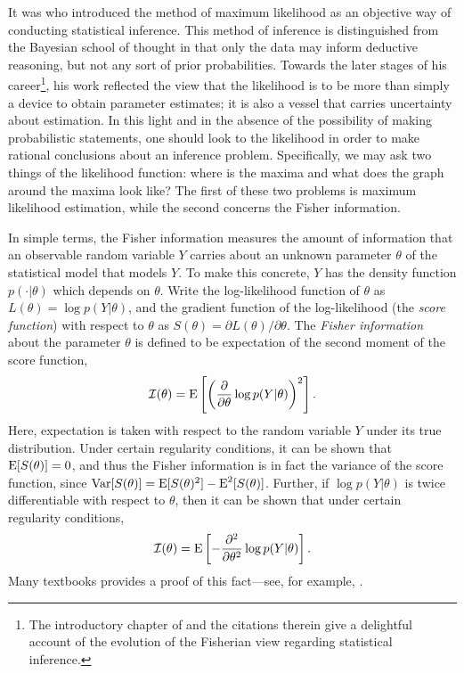 It was \citet{ra1922mathematical} who introduced the method of maximum likelihood as an objective way of conducting statistical inference.
This method of inference is distinguished from the Bayesian school of thought in that only the data may inform deductive reasoning, but not any sort of  prior probabilities.
Towards the later stages of his career\footnote{The introductory chapter of \citet{pawitan2001all} and the citations therein give a delightful  account of the evolution of the Fisherian view regarding statistical inference.}, his work reflected the view that the likelihood is to be more than simply a device to obtain parameter estimates; it is also a vessel that carries uncertainty about estimation.
In this light and in the absence of the possibility of making probabilistic statements, one should look to the likelihood in order to make rational conclusions about an inference problem.
Specifically, we may ask two things of the likelihood function: where is the maxima and what does the graph around the maxima look like?
The first of these two problems is maximum likelihood estimation, while the second concerns the Fisher information.

In simple terms, the Fisher information measures the amount of information that an observable random variable $Y$ carries about an unknown parameter $\theta$ of the statistical model that models $Y$.
To make this concrete, $Y$ has the density function $p(\cdot|\theta)$ which depends on $\theta$.
Write the log-likelihood function of $\theta$ as $L(\theta) = \log p(Y|\theta)$, and the gradient function of the log-likelihood (the \emph{score function}) with respect to $\theta$ as $S(\theta) = \partial L(\theta)/\partial\theta$.
The \emph{Fisher information} about the parameter $\theta$ is defined to be expectation of the second moment of the score function, 
\[
  {\mathcal I}(\theta) = \operatorname{E}\left[\left(\frac{\partial}{\partial\theta} \log p(Y|\theta)\right)^2\right].
\]
Here, expectation is taken with respect to the random variable $Y$ under its true distribution.
Under certain regularity conditions, it can be shown that $\operatorname{E}[S(\theta)] = 0$, and thus the Fisher information is in fact the variance of the score function, since $\operatorname{Var}[S(\theta)] = \operatorname{E}[S(\theta)^2] - \operatorname{E}^2[S(\theta)]$.
Further, if $\log p(Y|\theta)$ is twice differentiable with respect to $\theta$, then it can be shown that under certain regularity conditions,
\[
  {\mathcal I}(\theta) = \operatorname{E}\left[-\frac{\partial ^ 2}{\partial\theta^2} \log p(Y|\theta)\right].
\]
Many textbooks provides a proof of this fact---see, for example, \citet[Section 9.7]{wasserman2013all}.

